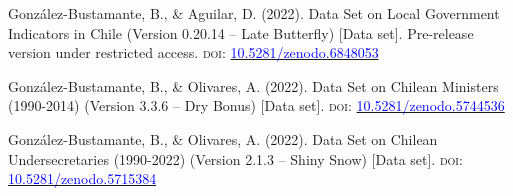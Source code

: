 





\begin{publications}

\begin{benumerate}{3}

\item{\small González-Bustamante, B., \& Aguilar, D. (2022). Data Set on Local Government Indicators in Chile (Version 0.20.14 -- Late Butterfly) [Data set]. Pre-release version under restricted access. {\scshape doi:} \href{https://doi.org/10.5281/zenodo.6848053}{\textcolor{blue}{10.5281/zenodo.6848053}}}\vspace{1mm}

\item{\small González-Bustamante, B., \& Olivares, A. (2022). Data Set on Chilean Ministers (1990-2014) (Version 3.3.6 -- Dry Bonus) [Data set]. {\scshape doi:} \href{https://doi.org/10.5281/zenodo.5744536}{\textcolor{blue}{10.5281/zenodo.5744536}}}\vspace{1mm}

\item{González-Bustamante, B., \& Olivares, A. (2022). Data Set on Chilean Undersecretaries (1990-2022) (Version 2.1.3 -- Shiny Snow) [Data set]. {\scshape doi:} \href{https://doi.org/10.5281/zenodo.5715384}{\textcolor{blue}{10.5281/zenodo.5715384}}}\vspace{1mm}

\end{benumerate}

\end{publications}


